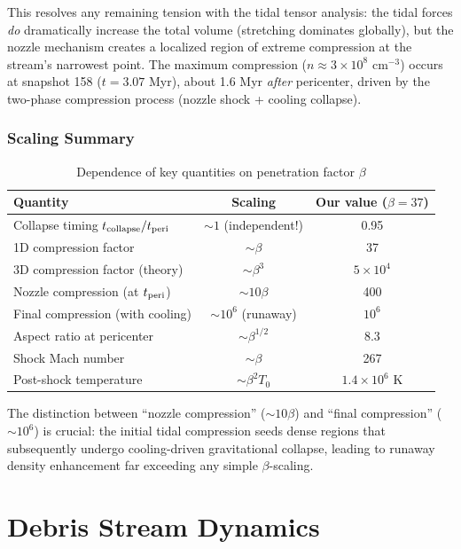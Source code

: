 \documentclass[twocolumn,amsmath,amssymb,prd,superscriptaddress,nofootinbib]{revtex4-2}
\begin{document}
This resolves any remaining tension with the tidal tensor analysis: the tidal forces \textit{do} dramatically increase the total volume (stretching dominates globally), but the nozzle mechanism creates a localized region of extreme compression at the stream's narrowest point. The maximum compression ($n \approx 3 \times 10^8$ cm$^{-3}$) occurs at snapshot 158 ($t = 3.07$ Myr), about 1.6 Myr \textit{after} pericenter, driven by the two-phase compression process (nozzle shock + cooling collapse).

\subsubsection{Scaling Summary}

\begin{table}[h]
\centering
\caption{Dependence of key quantities on penetration factor $\beta$}
\label{tab:beta_scaling}
\begin{tabular}{lcc}
\toprule
Quantity & Scaling & Our value ($\beta = 37$) \\
\midrule
Collapse timing $t_{\rm collapse}/t_{\rm peri}$ & $\sim 1$ (independent!) & 0.95 \\
1D compression factor & $\sim \beta$ & 37 \\
3D compression factor (theory) & $\sim \beta^3$ & $5 \times 10^4$ \\
Nozzle compression (at $t_{\rm peri}$) & $\sim 10\beta$ & 400 \\
Final compression (with cooling) & $\sim 10^6$ (runaway) & $10^6$ \\
Aspect ratio at pericenter & $\sim \beta^{1/2}$ & 8.3 \\
Shock Mach number & $\sim \beta$ & 267 \\
Post-shock temperature & $\sim \beta^2 T_0$ & $1.4 \times 10^6$ K \\
\bottomrule
\end{tabular}
\end{table}

The distinction between ``nozzle compression'' ($\sim 10\beta$) and ``final compression'' ($\sim 10^6$) is crucial: the initial tidal compression seeds dense regions that subsequently undergo cooling-driven gravitational collapse, leading to runaway density enhancement far exceeding any simple $\beta$-scaling.

\section{Debris Stream Dynamics}
\label{sec:debris}
\end{document}
